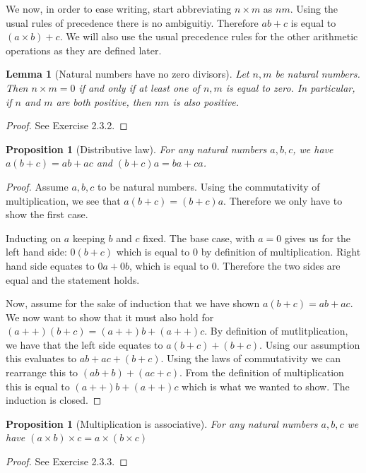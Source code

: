 \documentclass[a4paper, twocolumn]{report}
\newcounter{dummy} \numberwithin{dummy}{section}
\newtheorem{prp}[dummy]{Proposition}
\newtheorem{lma}[dummy]{Lemma}
\theoremstyle{definition}
\theoremstyle{solution}
\newcommand{\dplus}{{+}{+}} %
\begin{document}
We now, in order to ease writing, start abbreviating $n \times m$ as $nm$.
Using the usual rules of precedence there is no ambiguitiy. Therefore $ab + c$
is equal to $(a\times b) + c$. We will also use the usual precedence rules for
the other arithmetic operations as they are defined later.

\begin{lma}[Natural numbers have no zero divisors]
  \label{lma_233}
  Let $n, m$ be natural numbers. Then $n \times m = 0$ if and only if at least
  one of $n, m$ is equal to zero.  In particular, if $n$ and $m$ are both
  positive, then $nm$ is also positive. 
\end{lma}
\begin{proof}
  See Exercise 2.3.2.
\end{proof}

\begin{prp}[Distributive law]
  \label{prp_234}
  For any natural numbers $a, b, c$, we have $a(b+c) = ab + ac$ and $(b+c)a =
  ba + ca$.
\end{prp}

\begin{proof}
  Assume $a, b, c$ to be natural numbers.  Using the commutativity of
  multiplication, we see that $a(b+c) = (b+c)a$.  Therefore we only have to
  show the first case.

  Inducting on $a$ keeping $b$ and $c$ fixed.  The base case, with $a = 0$
  gives us for the left hand side: $0(b+c)$ which is equal to $0$ by definition
  of multiplication. Right hand side equates to $0a + 0b$, which is equal to
  $0$. Therefore the two sides are equal and the statement holds.

  Now, assume for the sake of induction that we have shown $a(b+c) = ab + ac$.
  We now want to show that it must also hold for $(a\dplus)(b+c) = (a\dplus)b +
  (a\dplus)c$.  By definition of mutlitplication, we have that the left side
  equates to $a(b+c) + (b+c)$. Using our assumption this evaluates to $ab + ac
  + (b+c)$.  Using the laws of commutativity we can rearrange this to $(ab + b)
  + (ac + c)$.  From the definition of multiplication this is equal to
  $(a\dplus)b + (a\dplus)c$ which is what we wanted to show. The induction is
  closed.
\end{proof}

\begin{prp}[Multiplication is associative]
  \label{prp_235} 
  For any natural numbers $a, b, c$ we have $(a\times b) \times c = a \times
  (b\times c)$
\end{prp}
\begin{proof}
  See Exercise 2.3.3.
\end{proof}
\end{document}

